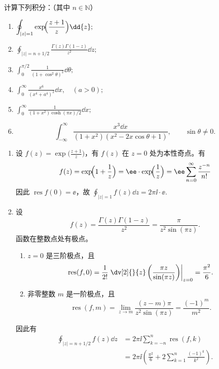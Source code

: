 \begin{question}
计算下列积分：（其中 \(n\in\mathbb{N}\)）

\begin{enumerate}
  \item \(\displaystyle\oint_{|z|=1}\exp\!\Bigl(\frac{z+1}{z}\Bigr)\dd{z};\)

  \item \(\displaystyle\oint_{|z|=n+1/2}\frac{\Gamma(z)\Gamma(1-z)}{z^2}\dd{z};\)

  \item \(\displaystyle\int_0^{\pi/2}\frac{1}{(1+\cos^2\theta)^2}\dd{}\theta;\)

  \item \(\displaystyle\int_0^\infty\frac{x^6}{(x^4+a^4)^2}\dd{x},\quad (a>0);\)

  \item \(\displaystyle\int_0^\infty\frac{1}{(1+x^2)\cosh(\pi x)/2}\dd{x};\)

  \item
  \[
  \int_{-\infty}^\infty
  \frac{x^3\dd{x}}{(1+x^2)(x^2-2x\cos\theta+1)},
  \qquad \sin\theta\ne0.
  \]

\end{enumerate}
\begin{solution}
\begin{enumerate}
  \item 设 \(f(z)=\exp\!\bigl(\frac{z+1}{z}\bigr)\)，有 \(f(z)\) 在 \(z=0\) 处为本性奇点。有
\[
f(z)=\exp\!\Bigl(1+\frac1z\Bigr)=\ee\cdot\exp\!\Bigl(\frac1z\Bigr)=\ee\sum_{n=0}^\infty\frac{z^{-n}}{n!}
\]
因此 \(\operatorname{res}f(0)=\ee\)，故 \(\displaystyle\oint_{|z|=1}f(z)\dd{z}=2\pi\ii\cdot\ee\).

  \item 设
  \[
  f(z)=\frac{\Gamma(z)\Gamma(1-z)}{z^2}
  =\frac{\pi}{z^2\sin(\pi z)}.
  \]
  函数在整数点处有极点。
  \begin{enumerate}
    \item \(z=0\) 是三阶极点，且
    \[
    \operatorname{res}(f,0)
    =\frac1{2!}\left.\dv[2]{}{z}
    \left(\frac{\pi z}{\sin(\pi z)}\right)\right|_{z=0}
    =\frac{\pi^2}{6}.
    \]
    \item 非零整数 \(m\) 是一阶极点，且
    \[
    \operatorname{res}(f,m)
    =\lim_{z\to m}\frac{(z-m)\pi}{z^2\sin(\pi z)}
    =\frac{(-1)^m}{m^2}.
    \]
  \end{enumerate}
因此有
\[
\begin{aligned}
\oint_{|z|=n+1/2}f(z)\dd{z}
&=2\pi\ii\sum_{k=-n}^{n}\operatorname{res}(f,k)\\
&=2\pi\ii\left(\frac{\pi^2}{6}
+2\sum_{k=1}^{n}\frac{(-1)^k}{k^2}\right).
\end{aligned}
\]


\end{enumerate}
\end{solution}
\end{question}
